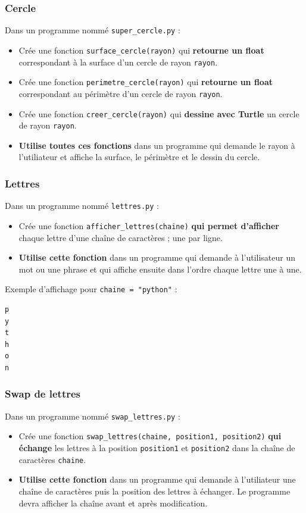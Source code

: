 \documentclass[11pt]{article}
\begin{document}
\subsubsection*{Cercle}
\label{sec:org24aada2}
Dans un programme nommé \texttt{super\_cercle.py} :
\begin{itemize}
\item Crée une fonction \texttt{surface\_cercle(rayon)} qui \textbf{retourne un float} correspondant à la surface d'un cercle de rayon \texttt{rayon}.
\item Crée une fonction \texttt{perimetre\_cercle(rayon)} qui \textbf{retourne un float} correspondant au périmètre d'un cercle de rayon \texttt{rayon}.
\item Crée une fonction \texttt{creer\_cercle(rayon)} qui \textbf{dessine avec Turtle} un cercle de rayon \texttt{rayon}.
\item \textbf{Utilise toutes ces fonctions} dans un programme qui demande le rayon à l'utiliateur et affiche la surface, le périmètre et le dessin du cercle.
\end{itemize}

\subsubsection*{Lettres}
\label{sec:orgb9ed302}
Dans un programme nommé \texttt{lettres.py} :
\begin{itemize}
\item Crée une fonction \texttt{afficher\_lettres(chaine)} \textbf{qui permet d'afficher} chaque lettre d'une chaîne de caractères ; une par ligne.
\item \textbf{Utilise cette fonction} dans un programme qui demande à l'utilisateur un mot ou une phrase et qui affiche ensuite dans l'ordre chaque lettre une à une.
\end{itemize}
Exemple d'affichage pour \texttt{chaine = "python"} :
\begin{verbatim}
p
y
t
h
o
n
\end{verbatim}

\subsubsection*{Swap de lettres}
\label{sec:org282ea3b}
Dans un programme nommé \texttt{swap\_lettres.py} :
\begin{itemize}
\item Crée une fonction \texttt{swap\_lettres(chaine, position1, position2)} \textbf{qui échange} les lettres à la position \texttt{position1} et \texttt{position2} dans la chaîne de caractères \texttt{chaine}.
\item \textbf{Utilise cette fonction} dans un programme qui demande à l'utiliateur une chaîne de caractères puis la position des lettres à échanger. Le programme devra afficher la chaîne avant et après modification.
\end{itemize}
\end{document}

